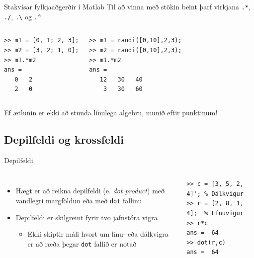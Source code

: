 \documentclass[handout]{beamer}
\begin{document}
\begin{frame}[fragile]{Stakvísar fylkjaaðgerðir í Matlab}
\vspace{\baselineskip}
Til að vinna með stökin beint þarf virkjana \texttt{.*}, \texttt{./}, \texttt{.\textbackslash} og \texttt{.\^}
\begin{columns}
\begin{verbatim}
>> m1 = [0, 1; 2, 3];
>> m2 = [3, 2; 1, 0];
>> m1.*m2
ans =
   0   2
   2   0
\end{verbatim}
\begin{verbatim}
>> m1 = randi([0,10],2,3);
>> m2 = randi([0,10],2,3);
>> m1.*m2
ans =
   12   30   40
    3   30   60
\end{verbatim}
\end{columns}
\vspace{\baselineskip}
Ef ætlunin er ekki að stunda línulega algebru, munið eftir punktinum!
\end{frame}

\subsection{Depilfeldi og krossfeldi}

\begin{frame}[fragile]{Depilfeldi}
\begin{columns}
\begin{itemize}
 \item Hægt er að reikna depilfeldi (e. \emph{dot product}) með vandlegri margföldun eða með \texttt{dot} fallinu
 \item Depilfeldi er skilgreint fyrir tvo jafnstóra vigra
 \begin{itemize}
  \item Ekki skiptir máli hvort um línu- eða dálkvigra er að ræða þegar \texttt{dot} fallið er notað
 \end{itemize}
\end{itemize}
\begin{verbatim}
>> c = [3, 5, 2, 4]'; % Dálkvigur
>> r = [2, 8, 1, 4];  % Línuvigur
>> r*c
ans =  64
>> dot(r,c)
ans =  64
\end{verbatim}
\end{columns}
\end{frame}
\end{document}
